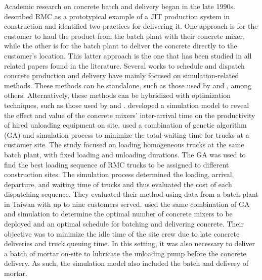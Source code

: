 \documentclass[authoryear,preprint,review,11pt]{elsarticle}
\begin{document}
Academic research on concrete batch and delivery began in the late 1990s. \cite{tommelein1999just} described RMC as a prototypical example of a JIT production system in construction and identified two practices for delivering it. One approach is for the customer to haul the product from the batch plant with their concrete mixer, while the other is for the batch plant to deliver the concrete directly to the customer's location. This latter approach is the one that has been studied in all related papers found in the literature. Several works to schedule and dispatch concrete production and delivery have mainly focused on simulation-related methods. These methods can be standalone, such as those used by \cite{zayed2001simulation} and \cite{wang2001scheduling}, among others. Alternatively, these methods can be hybridized with optimization techniques, such as those used by \cite{feng2004optimizing} and \cite{lu2005optimized}. \cite{wang2001scheduling} developed a simulation model to reveal the effect and value of the concrete mixers' inter-arrival time on the productivity of hired unloading equipment on site. \cite{feng2004optimizing} used a combination of genetic algorithm (GA) and simulation process to minimize the total waiting time for trucks at a customer site. The study focused on loading homogeneous trucks at the same batch plant, with fixed loading and unloading durations. The GA was used to find the best loading sequence of RMC trucks to be assigned to different construction sites. The simulation process determined the loading, arrival, departure, and waiting time of trucks and thus evaluated the cost of each dispatching sequence. They evaluated their method using data from a batch plant in Taiwan with up to nine customers served. \cite{lu2005optimized} used the same combination of GA and simulation to determine the optimal number of concrete mixers to be deployed and an optimal schedule for batching and delivering concrete. Their objective was to minimize the idle time of the site crew due to late concrete deliveries and truck queuing time. In this setting, it was also necessary to deliver a batch of mortar on-site to lubricate the unloading pump before the concrete delivery. As such, the simulation model also included the batch and delivery of mortar.
\end{document}
